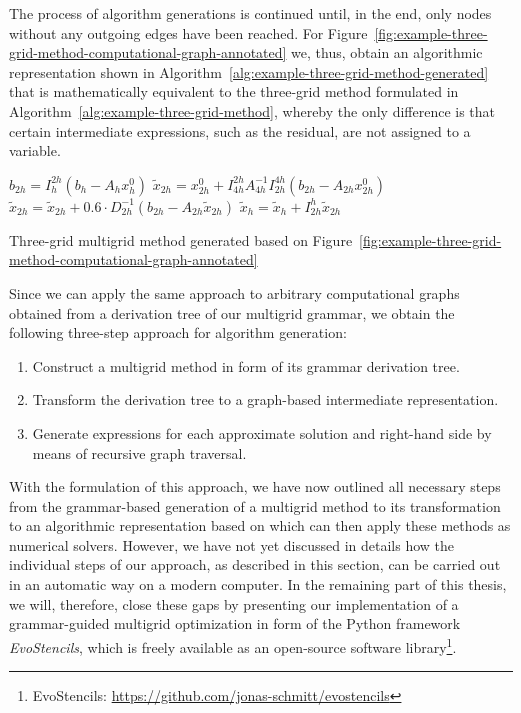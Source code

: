 The process of algorithm generations is continued until, in the end, only nodes without any outgoing edges have been reached.
For Figure~\ref{fig:example-three-grid-method-computational-graph-annotated} we, thus, obtain an algorithmic representation shown in Algorithm~\ref{alg:example-three-grid-method-generated} that is mathematically equivalent to the three-grid method formulated in Algorithm~\ref{alg:example-three-grid-method}, whereby the only difference is that certain intermediate expressions, such as the residual, are not assigned to a variable.
\begin{algorithm}
	\begin{algorithmic}[1]
		\State $ b_{2h} = I_{h}^{2h} \left(b_{h} - A_h x_{h}^0 \right)$
		\State $ \tilde{x}_{2h} = x^0_{2h} + I_{4h}^{2h} A_{4h}^{-1} I_{2h}^{4h} \left(b_{2h} - A_{2h} x^0_{2h}\right)$
		\State $ \tilde{x}_{2h} = \tilde{x}_{2h} + 0.6 \cdot D_{2h}^{-1} \left(b_{2h} - A_{2h} \tilde{x}_{2h}\right)$
		\State $\tilde{x}_{h} = \tilde{x}_{h}  + I_{2h}^h \tilde{x}_{2h}$
	\end{algorithmic}
	\caption{Three-grid multigrid method generated based on Figure~\ref{fig:example-three-grid-method-computational-graph-annotated}}
	\label{alg:example-three-grid-method-generated}
\end{algorithm}
Since we can apply the same approach to arbitrary computational graphs obtained from a derivation tree of our multigrid grammar, we obtain the following three-step approach for algorithm generation:
\begin{enumerate}
	\item Construct a multigrid method in form of its grammar derivation tree.
	\item Transform the derivation tree to a graph-based intermediate representation.
	\item Generate expressions for each approximate solution and right-hand side by means of recursive graph traversal.
\end{enumerate}
With the formulation of this approach, we have now outlined all necessary steps from the grammar-based generation of a multigrid method to its transformation to an algorithmic representation based on which can then apply these methods as numerical solvers.
However, we have not yet discussed in details how the individual steps of our approach, as described in this section, can be carried out in an automatic way on a modern computer.
In the remaining part of this thesis, we will, therefore, close these gaps by presenting our implementation of a grammar-guided multigrid optimization in form of the Python framework \emph{EvoStencils}, which is freely available as an open-source software library\footnote{EvoStencils: \url{https://github.com/jonas-schmitt/evostencils}}.
